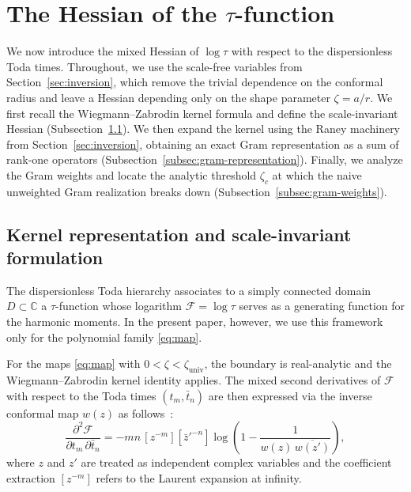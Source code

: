 \documentclass[11pt]{amsart}
\numberwithin{equation}{section}
\theoremstyle{plain}
\theoremstyle{definition}
\theoremstyle{remark}
\begin{document}


\section{The Hessian of the \texorpdfstring{$\tau$}{tau}-function}
\label{sec:Hessian}


We now introduce the mixed Hessian of $\log\tau$ with respect to the
dispersionless Toda times. Throughout, we use the scale-free variables from
Section~\ref{sec:inversion}, which remove the trivial dependence on the
conformal radius and leave a Hessian depending only on the shape parameter
$\zeta=a/r$. We first recall the Wiegmann--Zabrodin kernel formula and define
the scale-invariant Hessian
(Subsection~\ref{subsec:kernel-hessian}). We then expand the kernel using the
Raney machinery from Section~\ref{sec:inversion}, obtaining an exact Gram
representation as a sum of rank-one operators
(Subsection~\ref{subsec:gram-representation}). Finally, we analyze the Gram
weights and locate the analytic threshold $\zeta_c$ at which the naive
unweighted Gram realization breaks down (Subsection~\ref{subsec:gram-weights}).


\subsection{Kernel representation and scale-invariant formulation}
\label{subsec:kernel-hessian}

The dispersionless Toda hierarchy associates to a simply connected domain
$D \subset \mathbb{C}$ a $\tau$-function whose logarithm $\mathcal{F}=\log\tau$
serves as a generating function for the harmonic moments. In the present
paper, however, we use this framework only for the polynomial family
\eqref{eq:map}.

For the maps \eqref{eq:map} with $0<\zeta<\zeta_{\mathrm{univ}}$, the boundary is
real-analytic and the Wiegmann--Zabrodin kernel identity applies. The mixed
second derivatives of $\mathcal{F}$ with respect to the Toda times $(t_m,
	\bar{t}_n)$ are then expressed via the inverse conformal map $w(z)$ as
follows~\cite{WiegmannZabrodin2000,BOOKtau}:
\begin{equation}\label{eq:hessian-original}
	\frac{\partial^2 \mathcal{F}}{\partial t_m \, \partial \bar{t}_n}
	= -mn \, [z^{-m}][\bar{z}'^{-n}] \log\!\left(1 - \frac{1}{w(z)\,\overline{w(z')}}\right),
\end{equation}
where $z$ and $z'$ are treated as independent complex variables and the
coefficient extraction $[z^{-m}]$ refers to the Laurent expansion at infinity.
\end{document}
